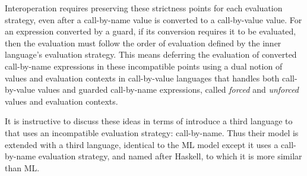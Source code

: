 Interoperation requires preserving these strictness points for each evaluation strategy, even after a call-by-name value is converted to a call-by-value value. For an expression converted by a guard, if its conversion requires it to be evaluated, then the evaluation must follow the order of evaluation defined by the inner language's evaluation strategy. This means deferring the evaluation of converted call-by-name expressions in these incompatible points using a dual notion of values and evaluation contexts in call-by-value languages that handles both call-by-value values and guarded call-by-name expressions, called \emph{forced} and \emph{unforced} values and evaluation contexts.

It is instructive to discuss these ideas in terms of introduce a third language to that uses an incompatible evaluation strategy: call-by-name. Thus their model is extended with a third language, identical to the ML model except it uses a call-by-name evaluation strategy, and named after Haskell, to which it is more similar than ML.